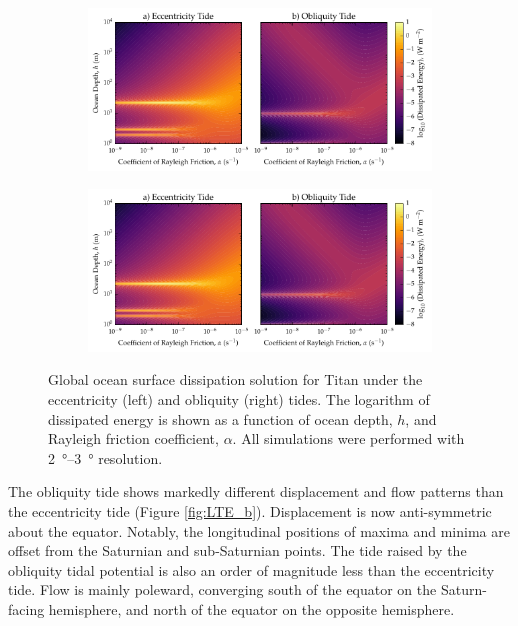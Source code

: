 \begin{figure}[!t]
    \centering
    \begin{subfigure}[t]{0.9\linewidth} %
        \includegraphics[width=\linewidth]{Figures/titan_linear}
        \label{fig:lincEccTitan}
    \end{subfigure}
    \begin{subfigure}[t]{0\linewidth} %
         \includegraphics[width=\linewidth]{Figures/titan_linear}
         \label{fig:linObliqTitan}   
    \end{subfigure}
    \vspace{-0.5cm}
\caption{Global ocean surface dissipation solution for Titan under the eccentricity (left) and obliquity (right) tides. The logarithm of dissipated energy is shown as a function of ocean depth, $h$, and Rayleigh friction coefficient, $\alpha$. All simulations were performed with \SIrange{2}{3}{\degree} resolution.}
\label{fig:linTitan}
\end{figure}

The obliquity tide shows markedly different displacement and flow patterns than the eccentricity tide (Figure \ref{fig:LTE_b}). Displacement is now anti-symmetric about the equator. Notably, the longitudinal positions of maxima and minima are offset from the Saturnian and sub-Saturnian points. The tide raised by the obliquity tidal potential is also an order of magnitude less than the eccentricity tide. Flow is mainly poleward, converging south of the equator on the Saturn-facing hemisphere, and north of the equator on the opposite hemisphere.

